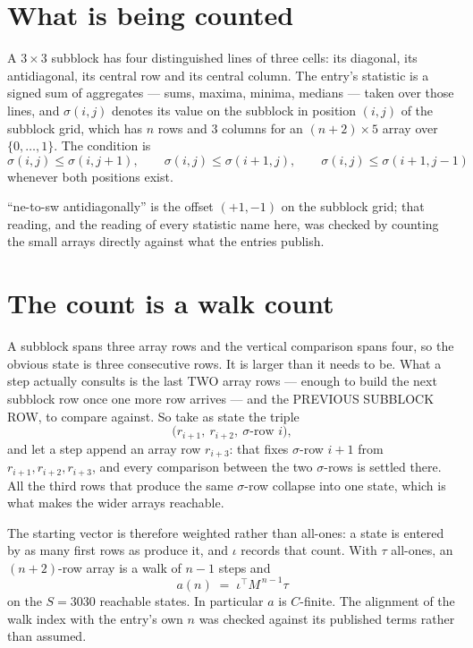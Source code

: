 \documentclass[11pt,a4paper]{article}
\theoremstyle{plain}
\theoremstyle{definition}
\begin{document}
\section{What is being counted}

A $3\times3$ subblock has four distinguished lines of three cells: its diagonal, its
antidiagonal, its central row and its central column. The entry's statistic is a signed sum of
aggregates --- sums, maxima, minima, medians --- taken over those lines, and $\sigma(i,j)$
denotes its value on the subblock in position $(i,j)$ of the subblock grid, which has $n$ rows
and $3$ columns for an $(n+2)\times5$ array over $\{0,\dots,1\}$. The condition is
\[
\sigma(i,j)\le\sigma(i,j+1),\qquad \sigma(i,j)\le\sigma(i+1,j),\qquad \sigma(i,j)\le\sigma(i+1,j-1)
\]
whenever both positions exist.

``ne-to-sw antidiagonally'' is the offset $(+1,-1)$ on the subblock grid; that reading, and
the reading of every statistic name here, was checked by counting the small arrays directly
against what the entries publish.

\section{The count is a walk count}

A subblock spans three array rows and the vertical comparison spans four, so the obvious state
is three consecutive rows. It is larger than it needs to be. What a step actually consults is
the last TWO array rows --- enough to build the next subblock row once one more row arrives ---
and the PREVIOUS SUBBLOCK ROW, to compare against. So take as state the triple
\[
\bigl(r_{i+1},\ r_{i+2},\ \sigma\text{-row }i\bigr),
\]
and let a step append an array row $r_{i+3}$: that fixes $\sigma$-row $i+1$ from
$r_{i+1},r_{i+2},r_{i+3}$, and every comparison between the two $\sigma$-rows is settled
there. All the third rows that produce the same $\sigma$-row collapse into one state, which is
what makes the wider arrays reachable.

The starting vector is therefore weighted rather than all-ones: a state is entered by as many
first rows as produce it, and $\iota$ records that count. With $\tau$ all-ones, an
$(n+2)$-row array is a walk of $n-1$ steps and
\[
a(n)\;=\;\iota^{\!\top}M^{\,n-1}\tau
\]
on the $S=3030$ reachable states. In particular $a$ is $C$-finite. The alignment of the walk
index with the entry's own $n$ was checked against its published terms rather than assumed.
\end{document}
